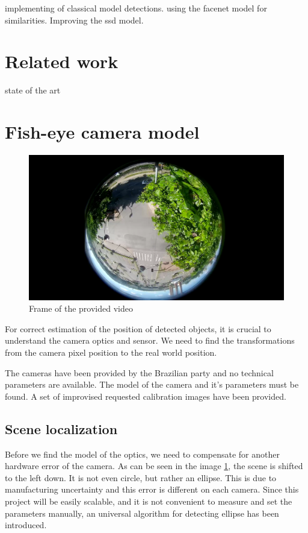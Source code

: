 \documentclass[a4paper,12pt,titlepage, twoside]{article}
\numberwithin{figure}{section}
\begin{document}
implementing of classical model detections.
using the facenet model for similarities.
Improving the ssd model.

\section{Related work}
state of the art

\section{Fish-eye camera model}

\begin{figure}[h]
\centering
\includegraphics[width=1\linewidth]{fig/stream1.png}
\caption{Frame of the provided video}
\label{fig:stream1}
\end{figure}

For correct estimation of the position of detected objects, it is crucial to understand the camera optics and sensor. We need to find the transformations from the camera pixel position to the real world position. 

The cameras have been provided by the Brazilian party and no technical parameters are available. The model of the camera and it's parameters must be found. A set of improvised requested calibration images have been provided.

\subsection{Scene localization}
\label{sec:scene_localization}
Before we find the model of the optics, we need to compensate for another hardware error of the camera. As can be seen in the image \ref{fig:stream1}, the scene is shifted to the left down. It is not even circle, but rather an ellipse. This is due to manufacturing uncertainty and this error is different on each camera. Since this project will be easily scalable, and it is not convenient to measure and set the parameters manually, an universal algorithm for detecting ellipse has been introduced.
\end{document}
